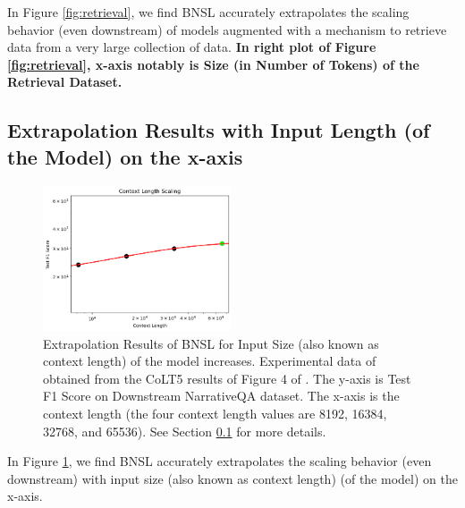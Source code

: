 \documentclass{article} %
\begin{document}
In Figure \ref{fig:retrieval}, we find BNSL accurately extrapolates the scaling behavior (even downstream) of models augmented with a mechanism to retrieve data from a very large collection of data. \textbf{In right plot of Figure \ref{fig:retrieval}, x-axis notably is Size (in Number of Tokens) of the Retrieval Dataset.}


\subsection{Extrapolation Results with Input Length (of the Model) on the x-axis}
\label{section:length}

\vspace{-3.5mm}

\begin{figure}[htbp]
    \centering
\includegraphics[width=0.497\textwidth]{figures/input_length/length.png}

\vspace{-3.5mm}
    \caption{
Extrapolation Results of BNSL for Input Size (also known as context length) of the model increases. Experimental data of obtained from the CoLT5 results of Figure 4 of \cite{ainslie2023colt5}. The y-axis is Test F1 Score on Downstream NarrativeQA \citep{kovcisky2018narrativeqa} dataset. The x-axis is the context length (the four context length values are 8192, 16384, 32768, and 65536).
See Section \ref{section:length} for more details.
    }
    \label{fig:length}
\end{figure}

In Figure \ref{fig:length}, we find BNSL accurately extrapolates the scaling behavior (even downstream) with input size (also known as context length) (of the model) on the x-axis.


\clearpage

\vspace*{-19.3mm}
\end{document}
